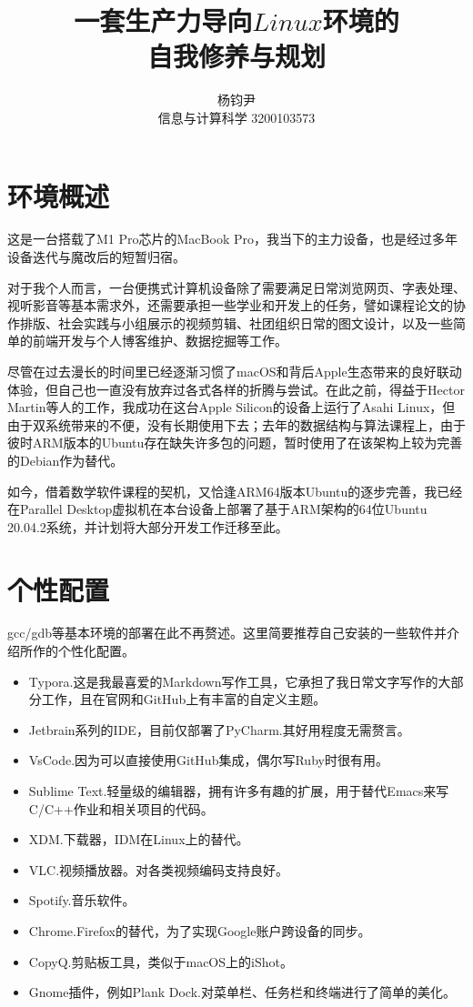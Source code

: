 \documentclass{ctexart}
\title{一套生产力导向$Linux$环境的\\自我修养与规划}
\author{杨钧尹 \\ 信息与计算科学 3200103573}
\begin{document}
\maketitle

\section{环境概述}

这是一台搭载了M1 Pro芯片的MacBook Pro，我当下的主力设备，也是经过多年设备迭代与魔改后的短暂归宿。

对于我个人而言，一台便携式计算机设备除了需要满足日常浏览网页、字表处理、视听影音等基本需求外，还需要承担一些学业和开发上的任务，譬如课程论文的协作排版、社会实践与小组展示的视频剪辑、社团组织日常的图文设计，以及一些简单的前端开发与个人博客维护、数据挖掘等工作。

尽管在过去漫长的时间里已经逐渐习惯了macOS和背后Apple生态带来的良好联动体验，但自己也一直没有放弃过各式各样的折腾与尝试。在此之前，得益于Hector Martin等人的工作\textsuperscript{\cite{ref1}}，我成功在这台Apple Silicon的设备上运行了Asahi Linux，但由于双系统带来的不便，没有长期使用下去；去年的数据结构与算法课程上，由于彼时ARM版本的Ubuntu存在缺失许多包的问题，暂时使用了在该架构上较为完善的Debian作为替代。

如今，借着数学软件课程的契机，又恰逢ARM64版本Ubuntu的逐步完善，我已经在Parallel Desktop虚拟机在本台设备上部署了基于ARM架构的64位Ubuntu 20.04.2系统，并计划将大部分开发工作迁移至此。

\section{个性配置}

gcc/gdb等基本环境的部署在此不再赘述。这里简要推荐自己安装的一些软件并介绍所作的个性化配置。
\begin{itemize}
	\item Typora.这是我最喜爱的Markdown写作工具，它承担了我日常文字写作的大部分工作，且在官网和GitHub上有丰富的自定义主题。
	\item Jetbrain系列的IDE，目前仅部署了PyCharm.其好用程度无需赘言。
	\item VsCode.因为可以直接使用GitHub集成，偶尔写Ruby时很有用。
	\item Sublime Text.轻量级的编辑器，拥有许多有趣的扩展，用于替代Emacs来写C/C++作业和相关项目的代码。
	\item XDM.下载器，IDM在Linux上的替代。
	\item VLC.视频播放器。对各类视频编码支持良好。
	\item Spotify.音乐软件。
	\item Chrome.Firefox的替代，为了实现Google账户跨设备的同步。
	\item CopyQ.剪贴板工具，类似于macOS上的iShot。
	\item Gnome插件\textsuperscript{\cite{ref2}}，例如Plank Dock.对菜单栏、任务栏和终端进行了简单的美化。
\end{itemize}
\end{document}
